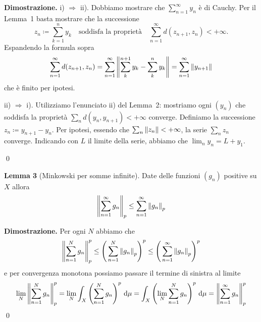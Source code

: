 \textbf{Dimostrazione.} 
i) $\Rightarrow$ ii). Dobbiamo mostrare che $\sum_{n=1}^\infty y_n$ è di Cauchy.
Per il Lemma~1 basta mostrare che la successione
%
$$
	z_n \coloneqq  \sum_{k=1}^n y_k \quad \text{soddisfa la proprietà} \quad
	\sum_{n=1}^\infty d(z_{n+1},z_n) < +\infty.
$$
%
Espandendo la formula sopra
%
$$
	\sum_{n=1}^\infty d(z_{n+1},z_n) = \sum_{n=1}^{\infty} \left\lVert \sum_k^{n+1} y_k - \sum_k^n y_k \right\rVert 
	= \sum_{n=1}^{\infty} \left\lVert y_{n+1} \right\rVert
$$
%
che è finito per ipotesi.

\vs

ii) $\Rightarrow$ i). Utilizziamo l'enunciato ii) del Lemma~2: mostriamo ogni $(y_n)$ che soddisfa la proprietà $\sum_n d(y_n,y_{n+1}) < +\infty$ converge.
Definiamo la successione $z_n \coloneqq y_{n+1} - y_n$. Per ipotesi, essendo che $\sum_n \left\lVert z_n \right\rVert < +\infty$, la serie $\sum_n z_n$ converge.
Indicando con $L$ il limite della serie, abbiamo che $\lim_n y_n = L + y_1$.


\qed

\hypertarget{prop:completeness_lemma_3}{}
\textbf{Lemma 3} 
(Minkowski per somme infinite). 
Date delle funzioni $(g_n)$ positive su $X$ allora
$$
\left\lVert \sum_{n=1}^\infty g_n \right\rVert_p \leq \sum_{n=1}^\infty \left\lVert g_n \right\rVert_p
$$

\textbf{Dimostrazione.}
Per ogni $N$ abbiamo che
$$
\left\lVert \sum_{n=1}^N g_n \right\rVert_p^p 
\leq \left( \,\sum_{n=1}^N \left\lVert g_n \right\rVert_p \right)^p 
\leq \left( \,\sum_{n=1}^\infty \left\lVert g_n \right\rVert_p \right)^p 
$$
e per convergenza monotona possiamo passare il termine di sinistra al limite
$$
\lim_N \left\lVert \sum_{n=1}^N g_n \right\rVert_p^p 
= \lim_N \int_X \left( \sum_{n=1}^N g_n \right)^p \,\mathrm{d} \mu
= \int_X \left( \lim_N \sum_{n=1}^N g_n \right)^p \,\mathrm{d} \mu
= \left\lVert \sum_{n=1}^\infty g_n \right\rVert_p^p
$$
\qed

